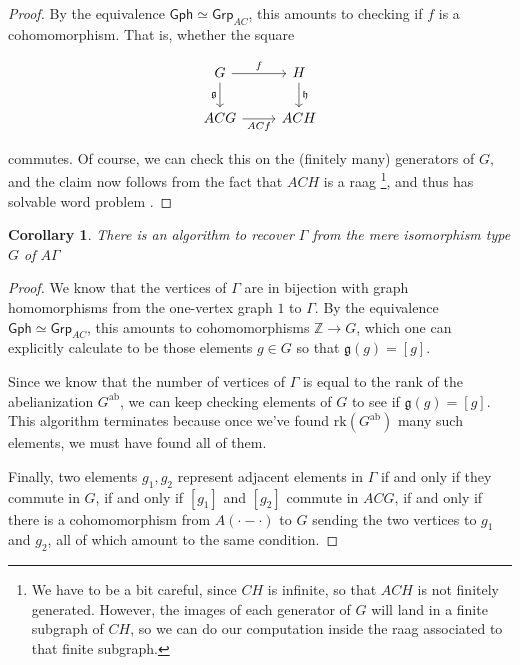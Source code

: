 \documentclass[12pt]{article}
\newtheorem{cor}{Corollary}
\theoremstyle{definition}
\theoremstyle{theorem}
\newcommand*{\catFont}[1]{\mathsf{#1}}
\newcommand{\Grp}{\catFont{Grp}}
\begin{document}
\begin{proof}
    By the equivalence $\mathsf{Gph} \simeq \Grp_{AC}$, this amounts to 
    checking if $f$ is a cohomomorphism. That is, whether the square

    \[
        \begin{tikzcd}
            G & H \\
            ACG & ACH
            \arrow["f", from=1-1, to=1-2]
            \arrow["\mathfrak{g}"', from=1-1, to=2-1]
            \arrow["ACf"', from=2-1, to=2-2]
            \arrow["\mathfrak{h}", from=1-2, to=2-2]
        \end{tikzcd}
    \]

    commutes. Of course, we can check this on the (finitely many) generators
    of $G$, 
    and the claim now follows from the fact that $ACH$ is a raag%
    \footnote{We have to be a bit careful, since $CH$ is infinite, so that 
    $ACH$ is not finitely generated. However, the images of each generator 
    of $G$ will land in a finite subgraph of $CH$, so we can do our 
    computation inside the raag associated to that finite subgraph.}, and thus
    has solvable word problem \cite{charneyIntroductionRightangledArtin2007}.
\end{proof}

\begin{cor}
  There is an algorithm to recover $\Gamma$ from the mere isomorphism 
  type $G$ of $A \Gamma$
\end{cor}

\begin{proof}
  We know that the vertices of $\Gamma$ are in bijection with 
  graph homomorphisms from the one-vertex graph $1$ to $\Gamma$. 
  By the equivalence $\mathsf{Gph} \simeq \Grp_{AC}$, this amounts 
  to cohomomorphisms $\mathbb{Z} \to G$, which one can explicitly 
  calculate to be those elements $g \in G$ so that $\mathfrak{g}(g) = [g]$.

  Since we know that the number of vertices of $\Gamma$ is equal to the 
  rank of the abelianization $G^\text{ab}$, we can keep checking elements 
  of $G$ to see if $\mathfrak{g}(g) = [g]$. This algorithm terminates 
  because once we've found $\text{rk}(G^\text{ab})$ many such elements, 
  we must have found all of them.

  Finally, two elements $g_1, g_2$ represent adjacent elements in $\Gamma$ 
  if and only if they commute in $G$, if and only if $[g_1]$ and $[g_2]$ 
  commute in $ACG$, if and only if there is a cohomomorphism from 
  $A(\cdot - \cdot)$ to $G$ sending the two vertices to $g_1$ and $g_2$, 
  all of which amount to the same condition.
\end{proof}
\end{document}
